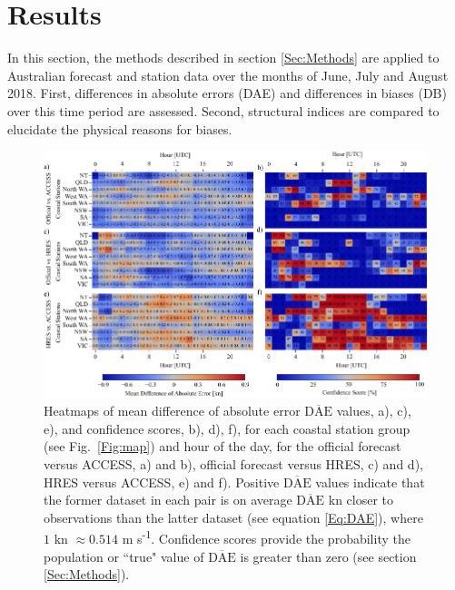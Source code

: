 \documentclass{ametsoc}
\begin{document}
\section{Results}
\label{Sec:Results}
In this section, the methods described in section \ref{Sec:Methods} are applied to Australian forecast and station data over the months of June, July and August 2018. First, differences in absolute errors (DAE) and differences in biases (DB) over this time period are assessed. Second, structural indices are compared to elucidate the physical reasons for biases. 

\begin{figure}
\centering
\includegraphics[width=39pc]{wpi_coastal.pdf}
\caption{Heatmaps of mean difference of absolute error $\overline{\text{DAE}}$ values, a), c), e), and confidence scores, b), d), f), for each coastal station group (see Fig.~\ref{Fig:map}) and hour of the day, for the official forecast versus ACCESS, a) and b), official forecast versus HRES, c) and d), HRES versus ACCESS, e) and f). Positive $\overline{\text{DAE}}$ values indicate that the former dataset in each pair is on average $\overline{\text{DAE}}$ kn closer to observations than the latter dataset (see equation \ref{Eq:DAE}), where $1$ kn $\approx 0.514$ m s\textsuperscript{-1}. Confidence scores provide the probability the population or ``true" value of $\overline{\text{DAE}}$ is greater than zero (see section \ref{Sec:Methods}).}
\label{Fig:wpi_coastal}
\end{figure}
\end{document}

